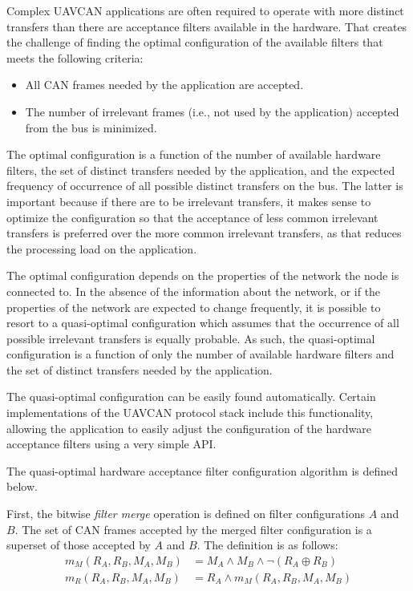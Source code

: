 Complex UAVCAN applications are often required to operate with more distinct transfers than there are
acceptance filters available in the hardware.
That creates the challenge of finding the optimal configuration of the available filters that meets the
following criteria:
\begin{itemize}
    \item All CAN frames needed by the application are accepted.
    \item The number of irrelevant frames (i.e., not used by the application) accepted from the bus is minimized.
\end{itemize}

The optimal configuration is a function of the number of available hardware filters,
the set of distinct transfers needed by the application,
and the expected frequency of occurrence of all possible distinct transfers on the bus.
The latter is important because if there are to be irrelevant transfers,
it makes sense to optimize the configuration so that the acceptance of less common irrelevant transfers
is preferred over the more common irrelevant transfers, as that reduces the processing load on the application.

The optimal configuration depends on the properties of the network the node is connected to.
In the absence of the information about the network,
or if the properties of the network are expected to change frequently,
it is possible to resort to a quasi-optimal configuration which assumes that
the occurrence of all possible irrelevant transfers is equally probable.
As such, the quasi-optimal configuration is a function of only the number of available hardware filters
and the set of distinct transfers needed by the application.

The quasi-optimal configuration can be easily found automatically.
Certain implementations of the UAVCAN protocol stack include this functionality,
allowing the application to easily adjust the configuration of the hardware acceptance filters
using a very simple API.

The quasi-optimal hardware acceptance filter configuration algorithm is defined below.

First, the bitwise \emph{filter merge} operation is defined on filter configurations $A$ and $B$.
The set of CAN frames accepted by the merged filter configuration is a superset of
those accepted by $A$ and $B$.
The definition is as follows:
\begin{equation*}
\begin{split}
    m_M(R_A, R_B, M_A, M_B) & = M_A \land M_B \land \neg (R_A \oplus R_B) \\
    m_R(R_A, R_B, M_A, M_B) & = R_A \land m_M(R_A, R_B, M_A, M_B)
\end{split}
\end{equation*}

